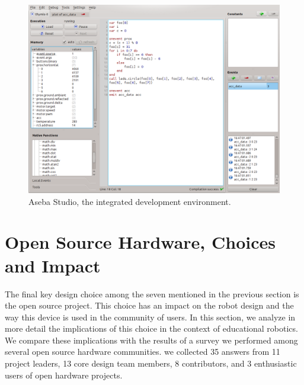 \documentclass[letterpaper, 10 pt, conference]{ieeeconf}  %
\begin{document}
\begin{figure}
\centering
\includegraphics[width=\columnwidth]{figures/aseba-studio}
\caption{Aseba Studio, the integrated development environment.}
\label{fig:aseba-studio}
\end{figure}

\section{Open Source Hardware, Choices and Impact}

The final key design choice among the seven mentioned in the previous section is the open source project.
This choice has an impact on the robot design and the way this device is used in the community of users. 
In this section, we analyze in more detail the implications of this choice in the context of educational robotics.
We compare these implications with the results of a survey we performed among several open source hardware communities. we collected 35 answers from 11 project leaders, 13 core design team members, 8 contributors, and 3 enthusiastic users of open hardware projects.
\end{document}
